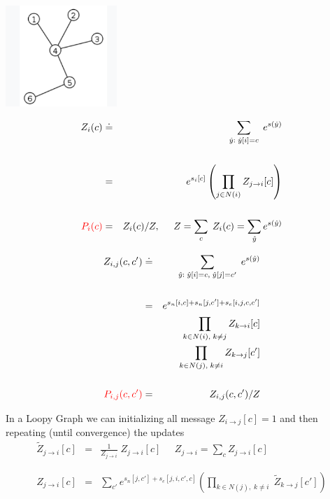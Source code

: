 {

\centerline{\includegraphics[height=1.5in]{../images/Tree}}

\begin{eqnarray*}
Z_i(c) & \doteq & \sum_{\hat{y}:\; \hat{y}[i] = c} \;e^{s(\hat{y})} \\
\\
& = & e^{s_i[c]} \left(\prod_{j\in N(i)} Z_{j \rightarrow i}[c]\right) \\
\\
{\color{red} P_i(c)} & = & Z_i(c)/Z,\;\;\;\;\; Z = \sum_{c}\;Z_i(c) = \sum_{\hat{y}} e^{s(\hat{y})}
\end{eqnarray*}



\begin{eqnarray*}
Z_{i,j}(c,c') & \doteq & \sum_{\hat{y}:\; \hat{y}[i] = c,\;\hat{y}[j] = c'} \;e^{s(\hat{y})} \\
\\
& = & e^{s_n[i,c] + s_n[j,c'] +s_e[i,j,c,c']} \\
& & \prod_{k\in N(i),\;k \not = j} Z_{k \rightarrow i}[c] \\
& & \prod_{k\in N(j),\;k \not = i} Z_{k \rightarrow j}[c'] \\
\\
{\color{red} P_{i,j}(c,c')} & = & Z_{i,j}(c,c')/Z
\end{eqnarray*}


In a Loopy Graph we can initializing all message $Z_{i \rightarrow j}[c] = 1$ and then repeating (until convergence) the updates
\vfill
\begin{eqnarray*}
  \tilde{Z}_{j \rightarrow i}[c] & = & \frac{1}{Z_{j \rightarrow i}}\;Z_{j \rightarrow i}[c] \;\;\;\;\;Z_{j \rightarrow i} = \sum_{c} Z_{j \rightarrow i}[c] \\
  \\
  \\
  Z_{j\rightarrow i}[c] & = & \sum_{c'}  e^{s_n[j,c'] + s_e[j,i,c',c]}
    \left(\prod_{k \in N(j),\;k \not = i}\;\tilde{Z}_{k\rightarrow j}[c']\right)
\end{eqnarray*}

}
